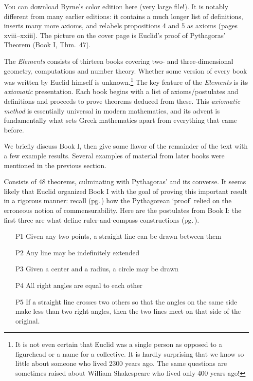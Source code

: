You can download Byrne's color edition \href{http://math.uci.edu/~ndonalds/Elements-I-VI.pdf}{here} (very large file!). It is notably different from many earlier editions: it contains a much longer list of definitions, inserts many more axioms, and relabels propositions 4 and 5 as axioms (pages xviii--xxiii). The picture on the cover page is Euclid's proof of Pythagoras' Theorem (Book I, Thm.\ 47).
\goodbreak


The \emph{Elements} consists of thirteen books covering two- and three-dimensional geometry, computations and number theory. Whether some version of every book was written by Euclid himself is unknown.\footnote{It is not even certain that Euclid was a single person as opposed to a figurehead or a name for a collective. It is hardly surprising that we know so little about someone who lived 2300 years ago. The same questions are sometimes raised about William Shakespeare who lived only 400 years ago!} The key feature of the \emph{Elements} is its \emph{axiomatic} presentation. Each book begins with a list of axioms/postulates and definitions and proceeds to prove theorems deduced from these. This \emph{axiomatic method} is essentially universal in modern mathematics, and its advent is fundamentally what sets Greek mathematics apart from everything that came before.\smallbreak

We briefly discuss Book I, then give some flavor of the remainder of the text with a few example results. Several examples of material from later books were mentioned in the previous section.



Consists of 48 theorems, culminating with Pythagoras' and its converse. It seems likely that Euclid organized Book I with the goal of proving this important result in a rigorous manner: recall (pg.\,\pageref{pthagorig}) how the Pythagorean `proof' relied on the erroneous notion of commensurability. Here are the postulates from Book I: the first three are what define ruler-and-compass constructions (pg.\,\pageref{pg:construction}).

\begin{itemize}\itemsep0pt
  \item[P1] Given any two points, a straight line can be drawn between them
  \item[P2] Any line may be indefinitely extended
  \item[P3] Given a center and a radius, a circle may be drawn
  \item[P4] All right angles are equal to each other
  \item[P5] If a straight line crosses two others so that the angles on the same side make less than two right angles, then the two lines meet on that side of the original.
\end{itemize}

